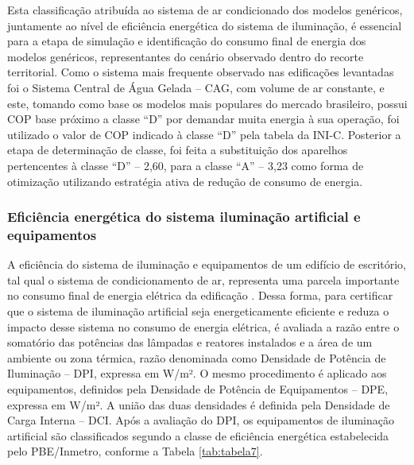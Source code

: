 \noindent Esta classificação atribuída ao sistema de ar condicionado dos modelos genéricos, juntamente ao nível de eficiência energética do sistema de iluminação, é essencial para a etapa de simulação e identificação do consumo final de energia dos modelos genéricos, representantes do cenário observado dentro do recorte territorial.\vspace*{0.3cm} \newline
Como o sistema mais frequente observado nas edificações levantadas foi o Sistema Central de Água Gelada – CAG, com volume de ar constante, e este, tomando como base os modelos mais populares do mercado brasileiro, possui COP base próximo a classe “D” por demandar muita energia à sua operação, foi utilizado o valor de COP indicado à classe “D” pela tabela da INI-C. Posterior a etapa de determinação de classe, foi feita a substituição dos aparelhos pertencentes à classe “D” – 2,60, para a classe “A” – 3,23 como forma de otimização utilizando estratégia ativa de redução de consumo de energia.

\subsubsection{Eficiência energética do sistema iluminação artificial e equipamentos}
A eficiência do sistema de iluminação e equipamentos de um edifício de escritório, tal qual o sistema de condicionamento de ar, representa uma parcela importante no consumo final de energia elétrica da edificação \cite{AmericanSocietyofHeatingRefrigeratingandAir-ConditioningEngineers-ASHRAE2019,ConselhoBrasileirodeConstrucaoSustentavel-CBCS2015}.\vspace*{0.3cm} \newline
Dessa forma, para certificar que o sistema de iluminação artificial seja energeticamente eficiente e reduza o impacto desse sistema no consumo de energia elétrica, é avaliada a razão entre o somatório das potências das lâmpadas e reatores instalados e a área de um ambiente ou zona térmica, razão denominada como Densidade de Potência de Iluminação – DPI, expressa em W/m². O mesmo procedimento é aplicado aos equipamentos, definidos pela Densidade de Potência de Equipamentos – DPE, expressa em W/m². A união das duas densidades é definida pela Densidade de Carga Interna – DCI.\vspace*{0.3cm} \newline
Após a avaliação do DPI, os equipamentos de iluminação artificial são classificados segundo a classe de eficiência energética estabelecida pelo PBE/Inmetro, conforme a Tabela \ref{tab:tabela7}.

